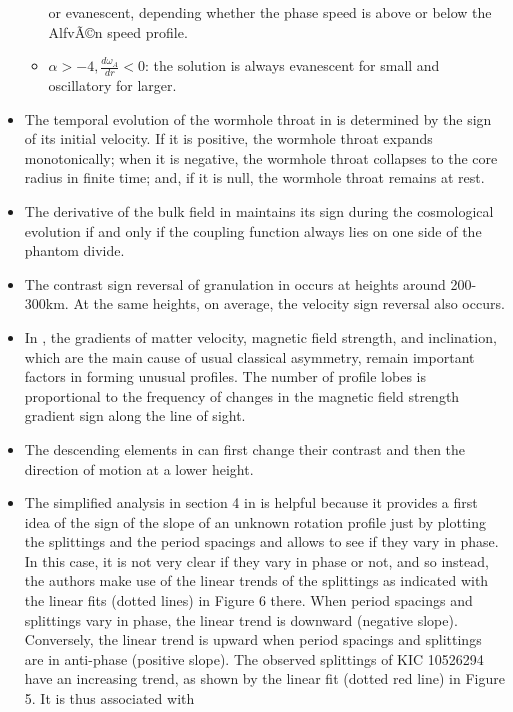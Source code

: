 \documentclass[11pt]{book}
\begin{document}
\begin{itemize}
\begin{itemize}
or evanescent, depending whether the phase speed is above or below
the AlfvÃ©n speed profile.
\item $\alpha>-4,\frac{d\omega_{A}}{dr}<0$: the solution is always evanescent
for small and oscillatory for larger.
\end{itemize}
\item The temporal evolution of the wormhole throat in \cite{bejarano2007thin}
is determined by the sign of its initial velocity. If it is positive,
the wormhole throat expands monotonically; when it is negative, the
wormhole throat collapses to the core radius in finite time; and,
if it is null, the wormhole throat remains at rest.
\item The derivative of the bulk field in \cite{setare2009braneworld}
maintains its sign during the cosmological evolution if and only if
the coupling function always lies on one side of the phantom divide.
\item The contrast sign reversal of granulation in \cite{kostik2009solar}
occurs at heights around 200-300km. At the same heights, on average,
the velocity sign reversal also occurs.
\item In \cite{sheminova2009origin},
the gradients of matter velocity, magnetic field strength, and inclination,
which are the main cause of usual classical asymmetry, remain important
factors in forming unusual profiles. The number of profile lobes is
proportional to the frequency of changes in the magnetic field strength
gradient sign along the line of sight.
\item The descending elements in \cite{kostik2012properties}
can first change their contrast and then the direction of motion at
a lower height.
\item The simplified analysis in section 4 in \cite{triana2015internal}
is helpful because it provides a first idea of the sign of the slope
of an unknown rotation profile just by plotting the splittings and
the period spacings and allows to see if they vary in phase. In this
case, it is not very clear if they vary in phase or not, and so instead,
the authors make use of the linear trends of the splittings as indicated
with the linear fits (dotted lines) in Figure 6 there. When period
spacings and splittings vary in phase, the linear trend is downward
(negative slope). Conversely, the linear trend is upward when period
spacings and splittings are in anti-phase (positive slope). The observed
splittings of KIC 10526294 have an increasing trend, as shown by the
linear fit (dotted red line) in Figure 5. It is thus associated with

\end{itemize}
\end{document}
